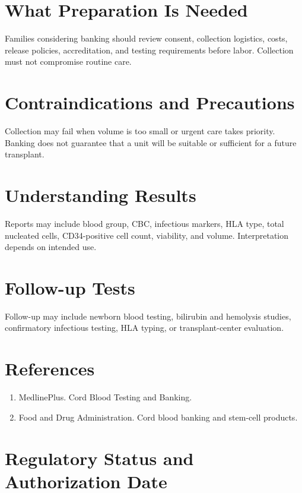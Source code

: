 \section*{What Preparation Is Needed}
Families considering banking should review consent, collection logistics, costs, release policies, accreditation, and testing requirements before labor. Collection must not compromise routine care.
\section*{Contraindications and Precautions}
Collection may fail when volume is too small or urgent care takes priority. Banking does not guarantee that a unit will be suitable or sufficient for a future transplant.
\section*{Understanding Results}
Reports may include blood group, CBC, infectious markers, HLA type, total nucleated cells, CD34-positive cell count, viability, and volume. Interpretation depends on intended use.
\section*{Follow-up Tests}
Follow-up may include newborn blood testing, bilirubin and hemolysis studies, confirmatory infectious testing, HLA typing, or transplant-center evaluation.
\section*{References}
\begin{enumerate}\item MedlinePlus. Cord Blood Testing and Banking.\item Food and Drug Administration. Cord blood banking and stem-cell products.\end{enumerate}
\clearpage
\section*{Regulatory Status and Authorization Date}\clearpage
